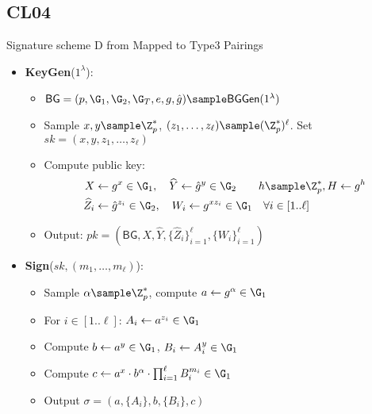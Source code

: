 % 
% 

\newpage
\subsection{CL04 \cite{hutchison_signature_2004}}
Signature scheme D from \cite{hutchison_signature_2004} Mapped to Type3 Pairings

\begin{itemize}
    \item \textbf{KeyGen}($1^\lambda$):
    \begin{itemize}
        \item $\mathsf{BG} = (p, \G_1, \G_2, \G_T, e, g, \hat{g}) \sample \mathsf{BGGen}(1^\lambda)$
        \item Sample $x, y \sample \Z_p^*$, $(z_1, \ldots, z_\ell) \sample (\Z_p^*)^\ell$. Set $sk = (x, y, z_1, \ldots, z_\ell)$
        \item Compute public key:
            \begin{align*}
                X &\gets g^x \in \G_1, \quad \widehat{Y} \gets \hat{g}^y \in \G_2 \qquad h \sample \Z_p^*, H \gets g^h\\
                \widehat{Z}_i &\gets \hat{g}^{z_i} \in \G_2, \quad W_i \gets g^{x z_i} \in \G_1 \quad \forall i \in [1..\ell]
            \end{align*}
        \item Output: $pk = (\mathsf{BG}, X, \widehat{Y}, \{\widehat{Z}_i\}_{i=1}^\ell, \{W_i\}_{i=1}^\ell)$
    \end{itemize}
    
    \item \textbf{Sign}($sk, (m_1,\ldots,m_\ell)$):
    \begin{itemize}
        \item Sample $\alpha \sample \Z_p^*$, compute $a \gets g^\alpha \in \G_1$
        \item For $i \in [1..\ell]$: $A_i \gets a^{z_i} \in \G_1$
        \item Compute $b \gets a^y \in \G_1$, $B_i \gets A_i^y \in \G_1$
        \item Compute $c \gets a^{x} \cdot b^{\alpha} \cdot \prod_{i=1}^\ell B_i^{m_i} \in \G_1$
        \item Output $\sigma = (a, \{A_i\}, b, \{B_i\}, c)$
    \end{itemize}


\end{itemize}
